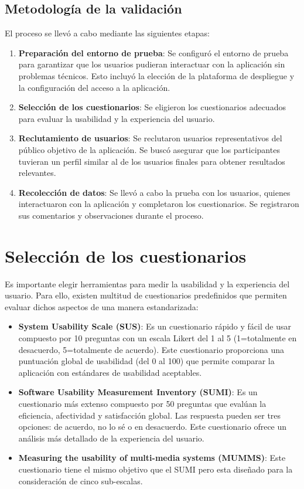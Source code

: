 \subsection{Metodología de la validación}

El proceso se llevó a cabo mediante las siguientes etapas: 
\begin{enumerate}
    \item \textbf{Preparación del entorno de prueba}: Se configuró el entorno de prueba para garantizar que los usuarios pudieran interactuar con la aplicación sin problemas técnicos. Esto incluyó la elección de la plataforma de despliegue y la configuración del acceso a la aplicación.
    \item \textbf{Selección de los cuestionarios}: Se eligieron los cuestionarios adecuados para evaluar la usabilidad y la experiencia del usuario. 
    \item \textbf{Reclutamiento de usuarios}: Se reclutaron usuarios representativos del público objetivo de la aplicación. Se buscó asegurar que los participantes tuvieran un perfil similar al de los usuarios finales para obtener resultados relevantes.
    \item \textbf{Recolección de datos}: Se llevó a cabo la prueba con los usuarios, quienes interactuaron con la aplicación y completaron los cuestionarios. Se registraron sus comentarios y observaciones durante el proceso.
\end{enumerate}

\newpage

\section{Selección de los cuestionarios}

Es importante elegir herramientas para medir la usabilidad y la experiencia del usuario. Para ello, existen multitud de cuestionarios predefinidos 
que permiten evaluar dichos aspectos de una manera estandarizada: \cite{uocCuestionarios2021}

\begin{itemize}
    \item \textbf{System Usability Scale (SUS)}: Es un cuestionario rápido y fácil de usar compuesto por 10 preguntas con un escala Likert del 1 al 5 (1=totalmente en desacuerdo, 5=totalmente de acuerdo). Este cuestionario proporciona una puntuación global de usabilidad (del 0 al 100) que permite comparar la aplicación con estándares de usabilidad aceptables.
    \item \textbf{Software Usability Measurement Inventory (SUMI)}: Es un cuestionario más extenso compuesto por 50 preguntas que evalúan la eficiencia, afectividad y satisfacción global. Las respuesta pueden ser tres opciones: de acuerdo, no lo sé o en desacuerdo. Este cuestionario ofrece un análisis más detallado de la experiencia del usuario. 
    \item \textbf{Measuring the usability of multi-media systems (MUMMS)}: Este cuestionario tiene el mismo objetivo que el SUMI pero esta diseñado para la consideración de cinco sub-escalas.
\end{itemize}

